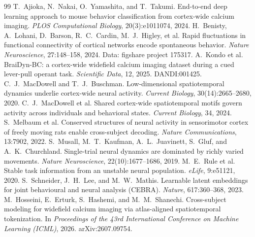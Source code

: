 \documentclass{article}
\begin{document}

\begin{thebibliography}{99}
 T.~Ajioka, N.~Nakai, O.~Yamashita, and T.~Takumi.
End-to-end deep learning approach to mouse behavior classification from cortex-wide calcium
imaging. \emph{PLOS Computational Biology}, 20(3):e1011074, 2024.
 H.~Benisty, A.~Lohani, D.~Barson, R.~C.~Cardin,
M.~J.~Higley, et al. Rapid fluctuations in functional connectivity of cortical networks encode
spontaneous behavior. \emph{Nature Neuroscience}, 27:148--158, 2024. Data: figshare project 175317.
 A.~Kondo et al. BraiDyn-BC: a cortex-wide widefield calcium
imaging dataset during a cued lever-pull operant task. \emph{Scientific Data}, 12, 2025.
DANDI:001425.
 C.~J.~MacDowell and T.~J.~Buschman.
Low-dimensional spatiotemporal dynamics underlie cortex-wide neural activity. \emph{Current
Biology}, 30(14):2665--2680, 2020.
 C.~J.~MacDowell et al. Shared cortex-wide
spatiotemporal motifs govern activity across individuals and behavioral states. \emph{Current
Biology}, 34, 2024.
 S.~Melbaum et al. Conserved structures of neural
activity in sensorimotor cortex of freely moving rats enable cross-subject decoding. \emph{Nature
Communications}, 13:7902, 2022.
 S.~Musall, M.~T.~Kaufman, A.~L.~Juavinett, S.~Gluf, and
A.~K.~Churchland. Single-trial neural dynamics are dominated by richly varied movements.
\emph{Nature Neuroscience}, 22(10):1677--1686, 2019.
 M.~E.~Rule et al. Stable task information from an unstable
neural population. \emph{eLife}, 9:e51121, 2020.
 S.~Schneider, J.~H.~Lee, and M.~W.~Mathis.
Learnable latent embeddings for joint behavioural and neural analysis (CEBRA). \emph{Nature},
617:360--368, 2023.
 M.~Hosseini, E.~Erturk, S.~Hashemi, and
M.~M.~Shanechi. Cross-subject modeling for widefield calcium imaging via atlas-aligned
spatiotemporal tokenization. In \emph{Proceedings of the 43rd International Conference on Machine
Learning (ICML)}, 2026. arXiv:2607.09754.
\end{thebibliography}
\end{document}

